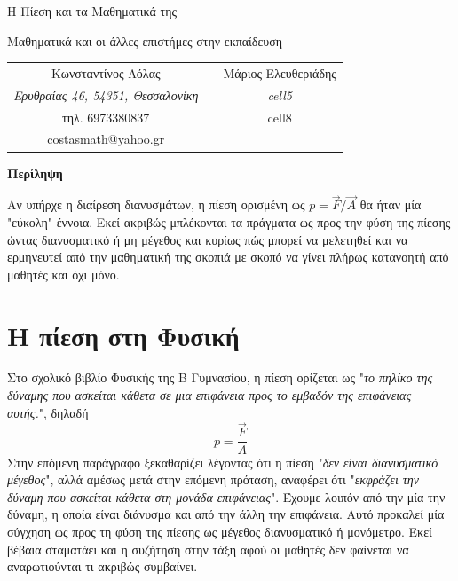 \documentclass[12pt,titlepage]{article}
\begin{document}
\begin{titlepage}
 \begin{center}
  \Huge {Η Πίεση και τα Μαθηματικά της}

  \vspace{1.5cm}
  \Large {Μαθηματικά και οι άλλες επιστήμες στην εκπαίδευση}
 \end{center}
 \vspace{2cm}
 \begin{center}

\begin{tabular}{ c c c }
 \Large{Κωνσταντίνος Λόλας} & & \Large{Μάριος Ελευθεριάδης} \\
 \textit{Ερυθραίας 46, 54351, Θεσσαλονίκη} & & \textit{cell5}  \\
 τηλ. 6973380837 & & cell8 \\
 costasmath@yahoo.gr & & \\
\end{tabular}

\vspace{2cm}
\textbf{Περίληψη}

  Αν υπήρχε η διαίρεση διανυσμάτων, η πίεση ορισμένη ως $p=\vec{F}/\vec{A}$ θα ήταν μία "εύκολη" έννοια. Εκεί ακριβώς μπλέκονται τα πράγματα ως προς την φύση της πίεσης ώντας διανυσματικό ή μη μέγεθος και κυρίως πώς μπορεί να μελετηθεί και να ερμηνευτεί από την μαθηματική της σκοπιά με σκοπό να γίνει πλήρως κατανοητή από μαθητές και όχι μόνο.

 \end{center}

\end{titlepage}




\newpage
\section{Η πίεση στη Φυσική}
Στο σχολικό βιβλίο Φυσικής της Β Γυμνασίου, η πίεση ορίζεται ως "\textit{το πηλίκο της δύναμης που ασκείται κάθετα σε μια επιφάνεια προς το εμβαδόν της επιφάνειας αυτής.}", δηλαδή
\begin{equation} \label{eq:1}
 p=\frac{\vec{F}}{A}
\end{equation}
Στην επόμενη παράγραφο ξεκαθαρίζει λέγοντας ότι η πίεση "\textit{δεν είναι διανυσματικό μέγεθος}", αλλά αμέσως μετά στην επόμενη πρόταση, αναφέρει ότι "\textit{εκφράζει την δύναμη που ασκείται κάθετα στη μονάδα επιφάνειας}". Έχουμε λοιπόν από την μία την δύναμη, η οποία είναι διάνυσμα και από την άλλη την επιφάνεια. Αυτό προκαλεί μία σύγχηση ως προς τη φύση της πίεσης ως μέγεθος διανυσματικό ή μονόμετρο. Εκεί βέβαια σταματάει και η συζήτηση στην τάξη αφού οι μαθητές δεν φαίνεται να αναρωτιούνται τι ακριβώς συμβαίνει.
\end{document}
